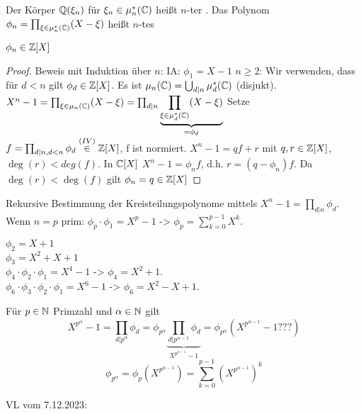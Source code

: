 \documentclass[../main.tex]{subfiles}
\begin{document}
\begin{definition}
    Der Körper $\mathbb{Q}(\xi_n)$ für $\xi_n\in\mu_n^*(\mathbb{C})$ heißt $n$-ter .
    Das Polynom $\phi_n=\prod_{\xi\in\mu_n^*(\mathbb{C})} (X-\xi)$ heißt $n$-tes 
\end{definition}

\begin{lemma}
    $\phi_n\in\mathbb{Z}[X]$
\end{lemma}
\begin{proof}
    Beweis mit Induktion über $n$:
    IA: $\phi_1 = X-1$ \checkmark
    $n\geq 2$: Wir verwenden, dass für $d<n$ gilt $\phi_d\in \mathbb{Z}[X]$.
    Es ist $\mu_n(\mathbb{C}) = \bigcup_{d|n}\mu_d^*(\mathbb{C})$ (disjukt).
    $X^n-1 = \prod_{\xi\in\mu_n(\mathbb{C})} (X-\xi) = \prod_{d|n}\underbrace{\prod_{\xi\in\mu_d^*(\mathbb{C})}(X-\xi)}_{=\phi_d}$
    Setze $f = \prod_{d|n,d<n}\phi_d \overset{(IV)}{\in}\mathbb{Z}[X]$, f ist normiert.
    $X^n-1=qf+r$ mit $q,r\in \mathbb{Z}[X]$, $\deg(r)<deg(f)$.
    In $\mathbb{C}[X]$ $X^n-1=\phi_n f$, d.h. $r = (q-\phi_n) f$.
    Da $\deg(r)<\deg(f)$ gilt $\phi_n=q\in \mathbb{Z}[X]$
\end{proof}
\begin{remark}
    Rekursive Bestimmung der Kreisteilungspolynome mittels $X^n-1 = \prod_{d|n}\phi_d$.
    Wenn $n =p$ prim: $\phi_p \cdot \phi_1 = X^p-1$ -> $\phi_p = \sum_{k=0}^{p-1} X^k$.
    
    \noindent
    $\phi_2 = X+1$\\
    $\phi_3 = X^2+X+1$\\
    $\phi_4 \cdot \phi_2 \cdot \phi_1 = X^4 -1$ -> $\phi_4 =X^2+1$.\\
    $\phi_6\cdot\phi_3\cdot\phi_2\cdot\phi_1 = X^6-1$ -> $\phi_6 = X^2-X+1$.

    Für $p\in \mathbb{N}$ Primzahl und $\alpha\in\mathbb{N}$ gilt
    $$X^{p^\alpha}-1 = \prod_{d|p^\alpha} \phi_d = \phi_{p^\alpha} \underbrace{\prod_{d|p^{\alpha-1}} \phi_d}_{X^{p^{\alpha-1}}-1}=\phi_{p^\alpha} (X^{p^{\alpha-1}}-1???)$$
    $$\phi_{p^\alpha} = \phi_p(X^{p^{\alpha-1}}) = \sum_{k=0}^{p-1} (X^{p^{\alpha -1}})^k$$
\end{remark}

\begin{flushright}
VL vom 7.12.2023:
\end{flushright}
\end{document}
